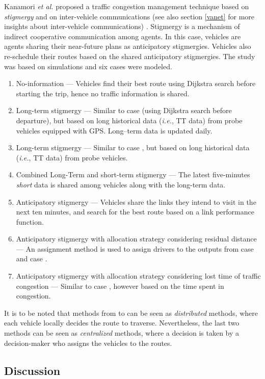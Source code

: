 \documentclass[10pt,onecolumn]{article}
\begin{document}
Kanamori \textit{et al.} proposed a traffic congestion management technique based on \textit{stigmergy} and on inter-vehicle communications (see also section \ref{vanet} for more insights about inter-vehicle communications) \cite{kanamori2012}.
Stigmergy is a mechanism of indirect cooperative communication among agents. In this case, vehicles are agents sharing their near-future plans as anticipatory stigmergies. Vehicles also re-schedule their routes based on the shared anticipatory stigmergies.
The study was based on simulations and six cases were modeled.
\begin{enumerate}
 \item {No-information} --- Vehicles find their best route using Dijkstra search before starting the trip, hence no traffic information is shared.
 \item {Long-term stigmergy} --- Similar to case  (using Dijkstra search before departure), but based on long historical data (\textit{i.e.}, TT data) from probe vehicles equipped with GPS. Long--term data is updated daily.
\item {Long-term stigmergy} --- Similar to case , but based on long historical data (\textit{i.e.}, TT data) from probe vehicles.
 \item {Combined Long-Term and short-term stigmergy} --- The latest five-minutes \textit{short} data is shared among vehicles along with the long-term data.
 \item {Anticipatory stigmergy} --- Vehicles share the links they intend to visit in the next ten minutes, and search for the best route based on a link performance function.
 \item {Anticipatory stigmergy with allocation strategy considering residual distance} --- An assignment method is used to assign drivers to the outputs from case  and case .
 \item {Anticipatory stigmergy with allocation strategy considering lost time of traffic congestion} --- Similar to case , however based on the time spent in congestion.
\end{enumerate}
It is to be noted that methods from  to  can be seen as \textit{distributed} methods, where each vehicle locally decides the route to traverse. Nevertheless, the last two methods can be seen as \textit{centralized} methods, where a decision is taken by a decision-maker who assigns the vehicles to the routes.


\subsection{Discussion}
\end{document}
